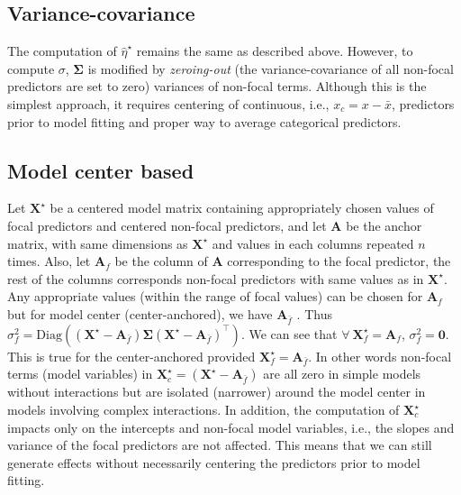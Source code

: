 \documentclass[10pt,letterpaper]{article}
\newcommand{\bX}{{\mathbf X}}
\newcommand{\bxo}{\bX^{\star}}
\newcommand{\bxof}{\bX_f^{\star}}
\newcommand{\ba}{{\mathbf A}}
\newcommand{\bao}{{\mathbf A}_0}
\newcommand{\baf}{{\mathbf A_f}}
\newcommand{\bafc}{{\mathbf A_{\bar{f}}}}
\begin{document}
\subsection*{Variance-covariance}

The computation of $\hat{\eta}^\star$ remains the same as described above. However, to compute $\sigma$, $\boldsymbol{\Sigma}$ is modified by \emph{zeroing-out} (the variance-covariance of all non-focal predictors are set to zero) variances of non-focal terms. Although this is the simplest approach, it requires centering of continuous, i.e., $x_c = x - \bar{x}$, predictors prior to model fitting and proper way to average categorical predictors.

\subsection*{Model center based}

Let $\bxo$ be a centered model matrix containing appropriately chosen values of focal predictors and centered non-focal predictors, and let $\ba$ be the anchor matrix, with same dimensions as $\bxo$ and values in each columns repeated $n$ times. Also, let $\baf$ be the column of $\ba$ corresponding to the focal predictor, the rest of the columns corresponds non-focal predictors with same values as in $\bxo$. Any appropriate values (within the range of focal values) can be chosen for $\baf$ but for model center (center-anchored), we have $\bafc$ . Thus $\sigma_f^2 = \textrm{Diag}((\bxo - \bafc) \boldsymbol{\Sigma} (\bxo - \bafc)^\top)$. We can see that $\forall ~\bxof=\baf$, $\sigma_f^2 = \boldsymbol{0}$. This is true for the center-anchored provided $\bxof=\bafc$. In other words non-focal terms (model variables) in $\bX^{\star}_{c} = (\bxo - \bafc)$ are all zero in simple models without interactions but are isolated (narrower) around the model center in models involving complex interactions. In addition, the computation of $\bX^{\star}_c$ impacts only on the intercepts and non-focal model variables, i.e., the slopes and variance of the focal predictors are not affected. This means that we can still generate effects without necessarily centering the predictors prior to model fitting.

\end{document}
